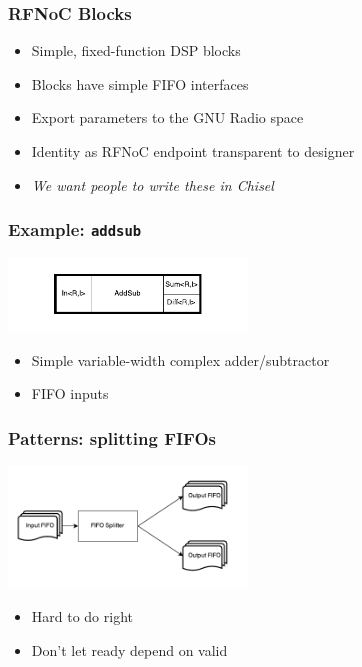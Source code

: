 \documentclass{beamer}
\begin{document}
\begin{frame}
\frametitle{RFNoC Blocks}
\begin{itemize}
\item Simple, fixed-function DSP blocks
\item Blocks have simple FIFO interfaces
\item Export parameters to the GNU Radio space
\item Identity as RFNoC endpoint transparent to designer
\item<2-> \emph{We want people to write these in Chisel}
\end{itemize}
\end{frame}

\begin{frame}
\frametitle{Example: \texttt{addsub}}
\begin{center}
\includegraphics[width=2.5in]{figs/addsub.pdf}
\end{center}
\begin{itemize}
\item Simple variable-width complex adder/subtractor
\item FIFO inputs
\end{itemize}
\end{frame}

\begin{frame}
\frametitle{Patterns: splitting FIFOs}
\begin{center}
\includegraphics[width=2.5in]{figs/fifo_splitter.pdf}
\end{center}
\begin{itemize}
\item Hard to do right
\item Don't let ready depend on valid
\end{itemize}
\end{frame}
\end{document}
